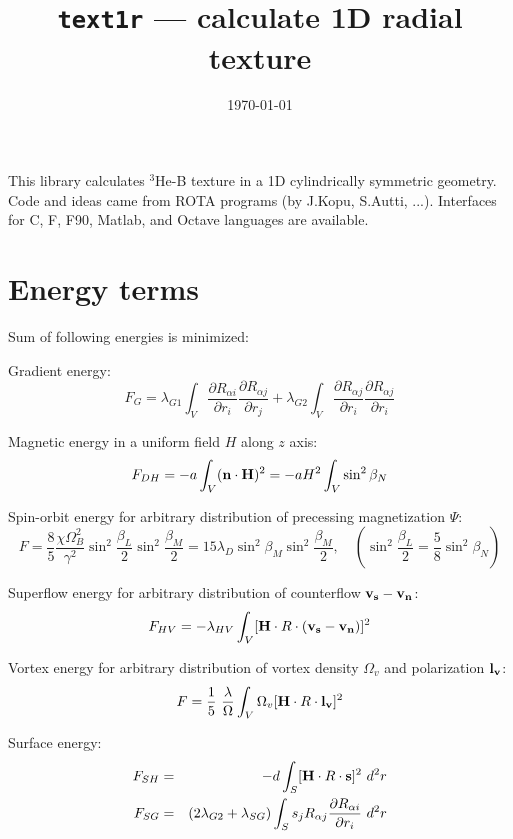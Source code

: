 \documentclass[a4paper]{article}
\begin{document}
\title{{\tt text1r} --- calculate 1D radial texture}
\date{\today}
\author{}
\maketitle

\def\sp{\sqrt{5}}
\def\st{\sqrt{3}}
\def\ddd#1#2{\frac{\partial #1}{\partial #2}}

This library calculates $^3$He-B texture in a 1D cylindrically
symmetric geometry. Code and ideas came from ROTA programs (by J.Kopu,
S.Autti, ...). Interfaces for C, F, F90, Matlab, and Octave languages
are available.

\section*{Energy terms}

Sum of following energies is minimized:

\def\bn{{\bf n}}
\def\bH{{\bf H}}
\def\divn{(\nabla\cdot\bn)}
\def\rotn{(\nabla\times\bn)}
\def\grn{\nabla\bn}

Gradient energy:
$$
F_{G}  = \lambda_{G1}\int_V
  \frac{\partial R_{\alpha i}}{\partial r_i}
  \frac{\partial R_{\alpha j}}{\partial r_j}
       + \lambda_{G2}\int_V
  \frac{\partial R_{\alpha j}}{\partial r_i}
  \frac{\partial R_{\alpha j}}{\partial r_i}
$$

Magnetic energy in a uniform field $H$ along $z$ axis:
$$
F_{DH} = - a \int_V (\bn\cdot\bH)^2 = -a H^2 \int_V \sin^2\beta_N
$$

Spin-orbit energy for arbitrary distribution of precessing magnetization $\Psi$:
$$
F = \frac85\frac{\chi\Omega_B^2}{\gamma^2} \sin^2\frac{\beta_L}{2} \sin^2\frac{\beta_M}{2} =
15\lambda_D \sin^2\beta_M \sin^2\frac{\beta_M}{2},\quad
\left(\sin^2\frac{\beta_L}{2} = \frac58\sin^2\beta_N\right)
$$

Superflow energy for arbitrary distribution of counterflow ${\bf v_s-v_n}$:
$$
F_{HV} = - \lambda_{HV} \int_V [\bH \cdot R \cdot ({\bf v_s-v_n})]^2
$$

Vortex energy for arbitrary distribution of vortex density $\Omega_v$
and polarization ${\bf l_v}$:
$$
F = \frac15\ \frac{\lambda}{\Omega} \int_V  \Omega_v [\bH \cdot R \cdot {\bf l_v}]^2
$$

Surface energy:
\begin{eqnarray*}
F_{SH} &=& -d
  \int_S [{\bf H} \cdot R \cdot {\bf s} ]^2\ d^2r\\
F_{SG} &=& (2\lambda_{G2} + \lambda_{SG})
  \int_S s_j R_{\alpha j}
    \frac{\partial R_{\alpha i}}{\partial r_i}\ d^2r\\
\end{eqnarray*}
\end{document}

